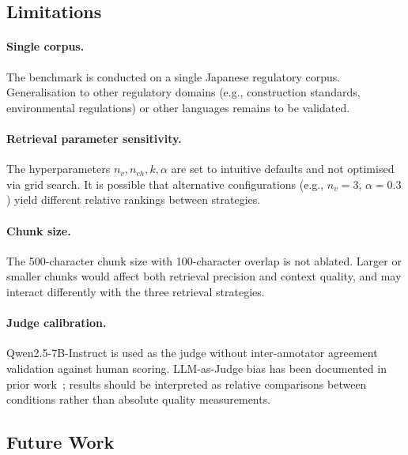 \documentclass[twocolumn]{article}
\begin{document}
\subsection{Limitations}

\paragraph{Single corpus.}
The benchmark is conducted on a single Japanese regulatory corpus.
Generalisation to other regulatory domains (e.g., construction standards,
environmental regulations) or other languages remains to be validated.

\paragraph{Retrieval parameter sensitivity.}
The hyperparameters $n_v, n_{ch}, k, \alpha$ are set to intuitive defaults
and not optimised via grid search.
It is possible that alternative configurations (e.g., $n_v = 3$, $\alpha = 0.3$)
yield different relative rankings between strategies.

\paragraph{Chunk size.}
The 500-character chunk size with 100-character overlap is not ablated.
Larger or smaller chunks would affect both retrieval precision and context
quality, and may interact differently with the three retrieval strategies.

\paragraph{Judge calibration.}
Qwen2.5-7B-Instruct is used as the judge without inter-annotator agreement
validation against human scoring.
LLM-as-Judge bias has been documented in prior work~\cite{zheng2023judging};
results should be interpreted as relative comparisons between conditions
rather than absolute quality measurements.

\subsection{Future Work}
\end{document}
